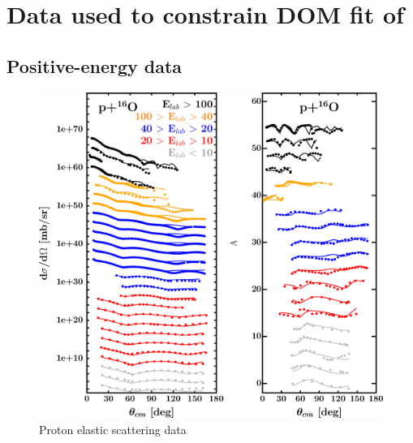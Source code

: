 
\label{DOMFits}

\section{Data used to constrain DOM fit of \oSix}
\label{O16DOMOutput}
\subsection{Positive-energy data}

\begin{figure}[H]
    \centering
    \begin{minipage}{0.45\textwidth}
        \centering
        \includegraphics[width=1.0\textwidth]{figures/o16_protonElastic.png}
        \caption{Proton elastic scattering data}
        \label{DOMFitData_o16_proton_elastic}
    \end{minipage}\hfill
    \begin{minipage}{0.45\textwidth}
        \centering

\end{minipage}
\end{figure}
